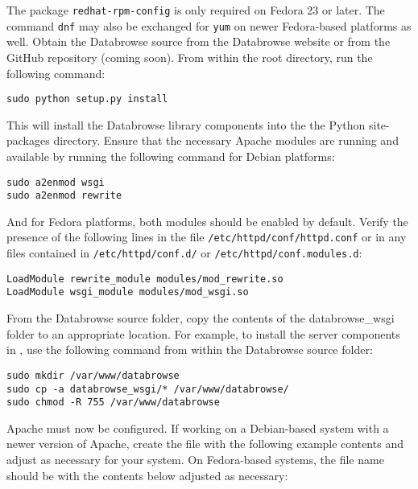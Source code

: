 \documentclass[10pt]{article}
\begin{document}
The package \texttt{redhat-rpm-config} is only required on Fedora 23 or later.  The command \texttt{dnf} may also be exchanged for \texttt{yum} on newer Fedora-based platforms as well.  Obtain the Databrowse source from the Databrowse website or from the GitHub repository (coming soon).  From within the root directory, run the following command:

\begin{verbatim}
sudo python setup.py install
\end{verbatim}

This will install the Databrowse library components into the the Python site-packages directory.  Ensure that the necessary Apache modules are running and available by running the following command for Debian platforms:

\begin{verbatim}
sudo a2enmod wsgi
sudo a2enmod rewrite
\end{verbatim}

And for Fedora platforms, both modules should be enabled by default.  Verify the presence of the following lines in the file \texttt{/etc/httpd/conf/httpd.conf} or in any files contained in \texttt{/etc/httpd/conf.d/} or \texttt{/etc/httpd/conf.modules.d}:

\begin{verbatim}
LoadModule rewrite_module modules/mod_rewrite.so
LoadModule wsgi_module modules/mod_wsgi.so
\end{verbatim}

From the Databrowse source folder, copy the contents of the databrowse\_wsgi folder to an appropriate location.  For example, to install the server components in , use the following command from within the Databrowse source folder:

\begin{verbatim}
sudo mkdir /var/www/databrowse
sudo cp -a databrowse_wsgi/* /var/www/databrowse/
sudo chmod -R 755 /var/www/databrowse
\end{verbatim}

Apache must now be configured.  If working on a Debian-based system with a newer version of Apache, create the file  with the following example contents and adjust as necessary for your system.  On Fedora-based systems, the file name should be  with the contents below adjusted as necessary:
\end{document}
